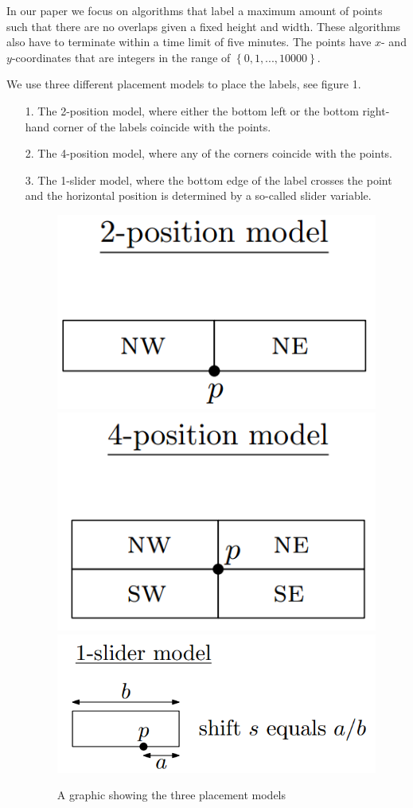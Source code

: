 \documentclass[crop=false,a4paper,oneside,11pt]{standalone}
\begin{document}
 In our paper we focus on algorithms that label a maximum amount of points such that there are no overlaps given a fixed height and width. These algorithms also have to terminate within a time limit of five minutes. The points have $x$- and $y$-coordinates that are integers in the range of $\left\{0,1,...,10000\right\}$.

 We use three different placement models to place the labels, see figure 1.
 \begin{enumerate}
 \item[1.] The 2-position model, where either the bottom left or the bottom right-hand corner of the labels coincide with the points.
 \item[2.] The 4-position model, where any of the corners coincide with the points.
 \item[3.] The 1-slider model, where the bottom edge of the label crosses the point and the horizontal position is determined by a so-called slider variable.
 \begin{figure}[h!]
 \includegraphics[scale = 0.5]{2pos.png} \includegraphics[scale = 0.5]{4pos.png} \includegraphics[scale = 0.5]{1slider.png}\\
 \caption{A graphic showing the three placement models}
 \end{figure}
 \end{enumerate}
\end{document}
